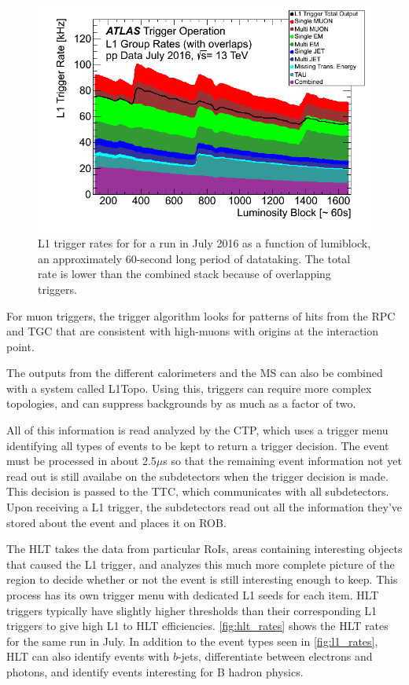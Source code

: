\begin{centering}
\begin{figure}[!hbt]
\myfloatalign
\includegraphics[width=.90\linewidth]{figures/atlas/Time_L1GroupRate_Stack_2016_07.png}
\caption{\ac{L1} trigger rates for for a run in July 2016 as a function of lumiblock, an approximately 60-second long period of datataking. The total rate is lower than the combined stack because of overlapping triggers.}
\label{fig:l1_rates}
\end{figure}
\end{centering}

For muon triggers, the trigger algorithm looks for patterns of hits from the \ac{RPC} and \ac{TGC} that are consistent with high-\pt muons with origins at the interaction point. 

The outputs from the different calorimeters and the \ac{MS} can also be combined with a system called \ac{L1Topo}. Using this, triggers can require more complex topologies, and can suppress backgrounds by as much as a factor of two. 

All of this information is read analyzed by the \ac{CTP}, which uses a trigger menu identifying all types of events to be kept to return a trigger decision. The event must be processed in about 2.5$\mu$s so that the remaining event information not yet read out is still availabe on the subdetectors when the trigger decision is made. This decision is passed to the \ac{TTC}, which communicates with all subdetectors. Upon receiving a \ac{L1} trigger, the subdetectors read out all the information they've stored about the event and places it on \acs{ROB}.

The \ac{HLT} takes the data from particular \acp{RoI}, areas containing interesting objects that caused the \ac{L1} trigger, and analyzes this much more complete picture of the region to decide whether or not the event is still interesting enough to keep. This process has its own trigger menu with dedicated \ac{L1} seeds for each item. \ac{HLT} triggers typically have slightly higher thresholds than their corresponding \ac{L1} triggers to give high \ac{L1} to \ac{HLT} efficiencies. \autoref{fig:hlt_rates} shows the \ac{HLT} rates for the same run in July. In addition to the event types seen in \autoref{fig:l1_rates}, \ac{HLT} can also identify events with $b$-jets, differentiate between electrons and photons, and identify events interesting for B hadron physics. 

